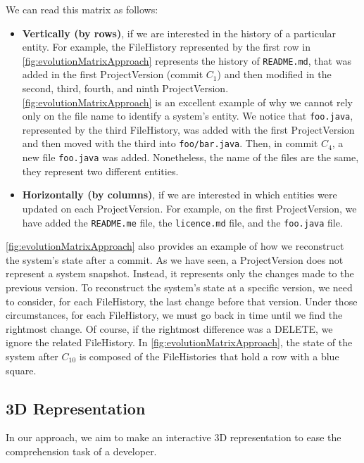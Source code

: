 We can read this matrix as follows:
 \begin{itemize}
     \item \textbf{Vertically (by rows)}, if we are interested in the history of a particular entity. 
     For example, the FileHistory represented by the first row in \autoref{fig:evolutionMatrixApproach} represents the history of \texttt{README.md}, that was added in the first ProjectVersion (commit $C_1$) and then modified in the second, third, fourth, and ninth ProjectVersion.
     \autoref{fig:evolutionMatrixApproach} is an excellent example of why we cannot rely only on the file name to identify a system's entity. 
     We notice that \texttt{foo.java}, represented by the third FileHistory, was added with the first ProjectVersion and then moved with the third into \texttt{foo/bar.java}. 
     Then, in commit $C_4$, a new file \texttt{foo.java} was added. Nonetheless, the name of the files are the same, they represent two different entities. 
     \item \textbf{Horizontally (by columns)}, if we are interested in which entities were updated on each ProjectVersion. 
    For example, on the first ProjectVersion, we have added the \texttt{README.me} file, the \texttt{licence.md} file, and the \texttt{foo.java} file. 
 \end{itemize}

\autoref{fig:evolutionMatrixApproach} also provides an example of how we reconstruct the system's state after a commit. 
As we have seen, a ProjectVersion does not represent a system snapshot.
Instead, it represents only the changes made to the previous version. 
To reconstruct the system's state at a specific version, we need to consider, for each FileHistory, the last change before that version. 
Under those circumstances, for each FileHistory, we must go back in time until we find the rightmost change. Of course, if the rightmost difference was a DELETE, we ignore the related FileHistory.
In \autoref{fig:evolutionMatrixApproach}, the state of the system after $C_{10}$ is composed of the FileHistories that hold a row with a blue square. 



\subsection{3D Representation}
\label{s:3DRepr}
In our approach, we aim to make an interactive 3D representation to ease the comprehension task of a developer. 

